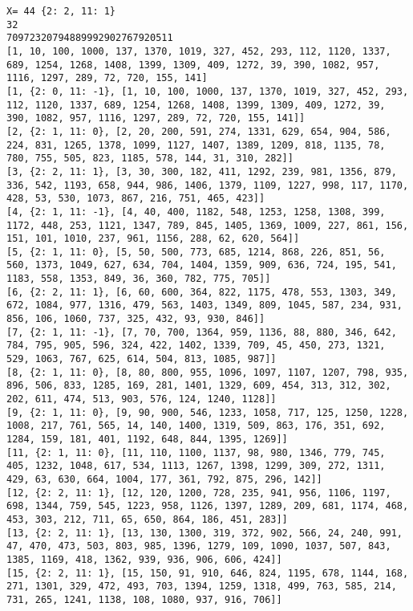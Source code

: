 \documentclass{article}
\begin{document}
\begin{verbatim}
X= 44 {2: 2, 11: 1}
32
70972320794889992902767920511
[1, 10, 100, 1000, 137, 1370, 1019, 327, 452, 293, 112, 1120, 1337, 689, 1254, 1268, 1408, 1399, 1309, 409, 1272, 39, 390, 1082, 957, 1116, 1297, 289, 72, 720, 155, 141]
[1, {2: 0, 11: -1}, [1, 10, 100, 1000, 137, 1370, 1019, 327, 452, 293, 112, 1120, 1337, 689, 1254, 1268, 1408, 1399, 1309, 409, 1272, 39, 390, 1082, 957, 1116, 1297, 289, 72, 720, 155, 141]]
[2, {2: 1, 11: 0}, [2, 20, 200, 591, 274, 1331, 629, 654, 904, 586, 224, 831, 1265, 1378, 1099, 1127, 1407, 1389, 1209, 818, 1135, 78, 780, 755, 505, 823, 1185, 578, 144, 31, 310, 282]]
[3, {2: 2, 11: 1}, [3, 30, 300, 182, 411, 1292, 239, 981, 1356, 879, 336, 542, 1193, 658, 944, 986, 1406, 1379, 1109, 1227, 998, 117, 1170, 428, 53, 530, 1073, 867, 216, 751, 465, 423]]
[4, {2: 1, 11: -1}, [4, 40, 400, 1182, 548, 1253, 1258, 1308, 399, 1172, 448, 253, 1121, 1347, 789, 845, 1405, 1369, 1009, 227, 861, 156, 151, 101, 1010, 237, 961, 1156, 288, 62, 620, 564]]
[5, {2: 1, 11: 0}, [5, 50, 500, 773, 685, 1214, 868, 226, 851, 56, 560, 1373, 1049, 627, 634, 704, 1404, 1359, 909, 636, 724, 195, 541, 1183, 558, 1353, 849, 36, 360, 782, 775, 705]]
[6, {2: 2, 11: 1}, [6, 60, 600, 364, 822, 1175, 478, 553, 1303, 349, 672, 1084, 977, 1316, 479, 563, 1403, 1349, 809, 1045, 587, 234, 931, 856, 106, 1060, 737, 325, 432, 93, 930, 846]]
[7, {2: 1, 11: -1}, [7, 70, 700, 1364, 959, 1136, 88, 880, 346, 642, 784, 795, 905, 596, 324, 422, 1402, 1339, 709, 45, 450, 273, 1321, 529, 1063, 767, 625, 614, 504, 813, 1085, 987]]
[8, {2: 1, 11: 0}, [8, 80, 800, 955, 1096, 1097, 1107, 1207, 798, 935, 896, 506, 833, 1285, 169, 281, 1401, 1329, 609, 454, 313, 312, 302, 202, 611, 474, 513, 903, 576, 124, 1240, 1128]]
[9, {2: 1, 11: 0}, [9, 90, 900, 546, 1233, 1058, 717, 125, 1250, 1228, 1008, 217, 761, 565, 14, 140, 1400, 1319, 509, 863, 176, 351, 692, 1284, 159, 181, 401, 1192, 648, 844, 1395, 1269]]
[11, {2: 1, 11: 0}, [11, 110, 1100, 1137, 98, 980, 1346, 779, 745, 405, 1232, 1048, 617, 534, 1113, 1267, 1398, 1299, 309, 272, 1311, 429, 63, 630, 664, 1004, 177, 361, 792, 875, 296, 142]]
[12, {2: 2, 11: 1}, [12, 120, 1200, 728, 235, 941, 956, 1106, 1197, 698, 1344, 759, 545, 1223, 958, 1126, 1397, 1289, 209, 681, 1174, 468, 453, 303, 212, 711, 65, 650, 864, 186, 451, 283]]
[13, {2: 2, 11: 1}, [13, 130, 1300, 319, 372, 902, 566, 24, 240, 991, 47, 470, 473, 503, 803, 985, 1396, 1279, 109, 1090, 1037, 507, 843, 1385, 1169, 418, 1362, 939, 936, 906, 606, 424]]
[15, {2: 2, 11: 1}, [15, 150, 91, 910, 646, 824, 1195, 678, 1144, 168, 271, 1301, 329, 472, 493, 703, 1394, 1259, 1318, 499, 763, 585, 214, 731, 265, 1241, 1138, 108, 1080, 937, 916, 706]]

\end{verbatim}
\end{document}
